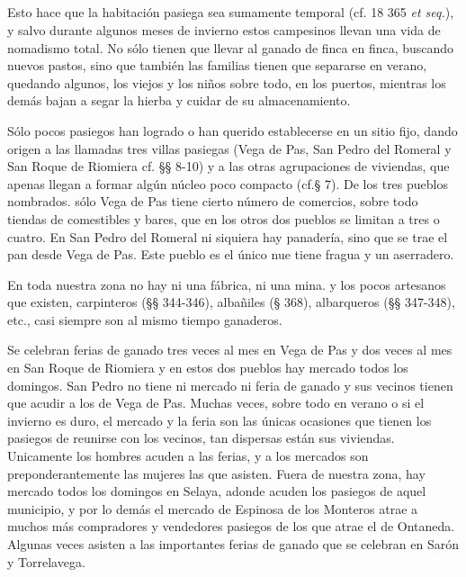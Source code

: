 \documentclass[11pt,spanish,b5paper]{book}
\begin{document}
\subsection{} Esto hace que la habitación pasiega sea sumamente temporal (cf. 18 365 \emph{et seq.}), y salvo durante algunos meses de invierno estos campesinos llevan una vida de nomadismo total. No sólo tienen que llevar al ganado de finca en finca, buscando nuevos pastos, sino que también las familias tienen que separarse en verano, quedando algunos, los viejos y los niños sobre todo, en los puertos, mientras los demás bajan a segar la hierba y cuidar de su almacenamiento.

Sólo pocos pasiegos han logrado o han querido establecerse en un sitio fijo, dando origen a las llamadas tres villas pasiegas (Vega de Pas, San Pedro del Romeral y San Roque de Riomiera cf. §§ 8-10) y a las otras agrupaciones de viviendas, que apenas llegan a formar algún núcleo poco compacto (cf.§ 7). De los tres pueblos nombrados. sólo Vega de Pas tiene cierto número de comercios, sobre todo tiendas de comestibles y bares, que en los otros dos pueblos se limitan a tres o cuatro. En San Pedro del Romeral ni siquiera hay panadería, sino que se trae el pan desde Vega de Pas. Este pueblo es el único nue tiene fragua y un aserradero.

En toda nuestra zona no hay ni una fábrica, ni una mina. y los pocos artesanos que existen, carpinteros (§§ 344-346), albañiles (§ 368), albarqueros (§§ 347-348), etc., casi siempre son al mismo tiempo ganaderos.

Se celebran ferias de ganado tres veces al mes en Vega de Pas y dos veces al mes en San Roque de Riomiera y en estos dos pueblos hay mercado todos los domingos. San Pedro no tiene ni mercado ni feria de ganado y sus vecinos tienen que acudir a los de Vega de Pas. Muchas veces, sobre todo en verano o si el invierno es duro, el mercado y la feria son las únicas ocasiones que tienen los pasiegos de reunirse con los vecinos, tan dispersas están sus viviendas. Unicamente los hombres acuden a las ferias, y a los mercados son preponderantemente las mujeres las que asisten.
Fuera de nuestra zona, hay mercado todos los domingos en Selaya, adonde acuden los pasiegos de aquel municipio, y por lo demás el mercado de Espinosa de los Monteros atrae a muchos más compradores y vendedores pasiegos de los que atrae el de Ontaneda. Algunas veces asisten a las importantes ferias de ganado que se celebran en Sarón y Torrelavega.
\end{document}
